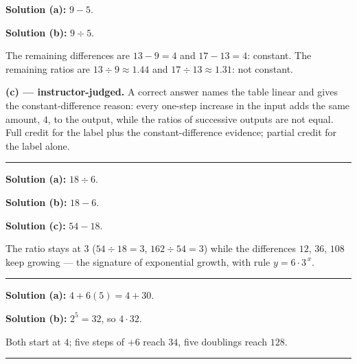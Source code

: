 \documentclass[12pt]{article}
\begin{document}



\textbf{Solution (a):} $9 - 5$. 

\textbf{Solution (b):} $9 \div 5$. 

The remaining differences are $13 - 9 = 4$ and $17 - 13 = 4$: constant. The remaining ratios are $13 \div 9 \approx 1.44$ and $17 \div 13 \approx 1.31$: not constant.

\textbf{(c) --- instructor-judged.} A correct answer names the table linear and gives the constant-difference reason: every one-step increase in the input adds the same amount, $4$, to the output, while the ratios of successive outputs are not equal. Full credit for the label plus the constant-difference evidence; partial credit for the label alone.

\vspace{0.2cm}\noindent\rule{\linewidth}{0.2pt}


\textbf{Solution (a):} $18 \div 6$. 

\textbf{Solution (b):} $18 - 6$. 

\textbf{Solution (c):} $54 - 18$. 

The ratio stays at $3$ ($54 \div 18 = 3$, $162 \div 54 = 3$) while the differences $12$, $36$, $108$ keep growing --- the signature of exponential growth, with rule $y = 6 \cdot 3^{\,x}$.

\vspace{0.2cm}\noindent\rule{\linewidth}{0.2pt}


\textbf{Solution (a):} $4 + 6(5) = 4 + 30$. 

\textbf{Solution (b):} $2^5 = 32$, so $4 \cdot 32$. 

Both start at $4$; five steps of $+6$ reach $34$, five doublings reach $128$.

\vspace{0.2cm}\noindent\rule{\linewidth}{0.2pt}

\end{document}

